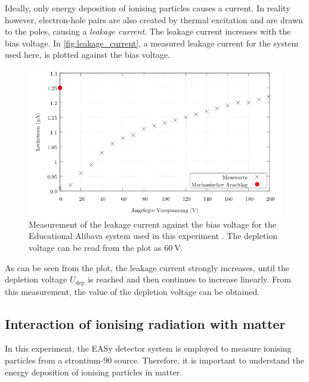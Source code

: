 Ideally, only energy deposition of ionising particles causes a current. In reality however, electron-hole pairs are also created by thermal excitation and are drawn to the poles,
causing a \textit{leakage current}. The leakage current increases with the bias voltage. In \autoref{fig:leakage_current}, a measured leakage current for the system used here,
is plotted against the bias voltage. 
\begin{figure}
    \centering 
    \includegraphics[width = .75\textwidth]{content/pics/leakage_current.png}
    \caption{Measurement of the leakage current against the bias voltage for the Educational Alibava system used in this experiment \cite{SiliconStrip}. 
    The depletion voltage can be read from the plot as $\qty{60}{\volt}$.}
    \label{fig:leakage_current}
\end{figure}
As can be seen from the plot, the leakage current strongly increases, until the depletion voltage $U_\text{dep}$ is reached and then continues to increase linearly.
From this measurement, the value of the depletion voltage can be obtained.

\subsection{Interaction of ionising radiation with matter}
In this experiment, the EASy detector system is employed to measure ionising particles from a strontium-90 source. 
Therefore, it is important to understand the energy deposition of ionising particles in matter.

